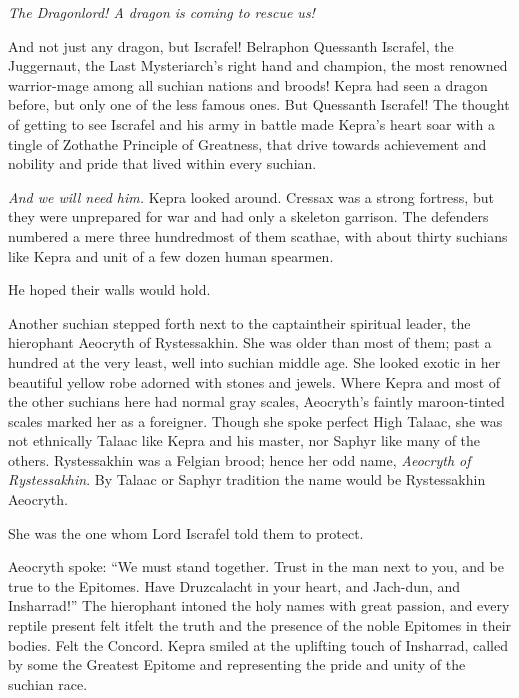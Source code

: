 \documentclass
  [a4paper,
   12pt,
   oneside
  ]%
  {article}
\begin{document}
\emph{The Dragonlord! A dragon is coming to rescue us!} 

And not just any dragon, but Iscrafel! Belraphon Quessanth Iscrafel, the Juggernaut, the Last Mysteriarch's right hand and champion, the most renowned warrior-mage among all suchian nations and broods! 
Kepra had seen a dragon before, but only one of the less famous ones.
But Quessanth Iscrafel! The thought of getting to see Iscrafel and his army in battle made Kepra's heart soar with a tingle of Zotha\dash{}the Principle of Greatness, that drive towards achievement and nobility and pride that lived within every suchian.

\emph{And we will need him.} 
Kepra looked around. 
Cressax was a strong fortress, but they were unprepared for war and had only a skeleton garrison.
The defenders numbered a mere three hundred\dash{}most of them scathae, with about thirty suchians like Kepra and unit of a few dozen human spearmen.

He hoped their walls would hold. 


Another suchian stepped forth next to the captain\dash{}their spiritual leader, the hierophant Aeocryth of Rystessakhin.
She was older than most of them; past a hundred at the very least, well into suchian middle age.
She looked exotic in her beautiful yellow robe adorned with stones and jewels. 
Where Kepra and most of the other suchians here had normal gray scales, Aeocryth’s faintly maroon-tinted scales marked her as a foreigner. 
Though she spoke perfect High Talaac, she was not ethnically Talaac like Kepra and his master, nor Saphyr like many of the others. 
Rystessakhin was a Felgian brood; hence her odd name, \emph{Aeocryth of Rystessakhin}. 
By Talaac or Saphyr tradition the name would be Rystessakhin Aeocryth. 

She was the one whom Lord Iscrafel told them to protect.

Aeocryth spoke: ``We must stand together. Trust in the man next to you, and be true to the Epitomes. Have Druzcalacht in your heart, and Jach-dun, and Insharrad!'' 
The hierophant intoned the holy names with great passion, and every reptile present felt it\dash{}felt the truth and the presence of the noble Epitomes in their bodies. 
Felt the Concord. 
Kepra smiled at the uplifting touch of Insharrad, called by some the Greatest Epitome and representing the pride and unity of the suchian race.
\end{document}
